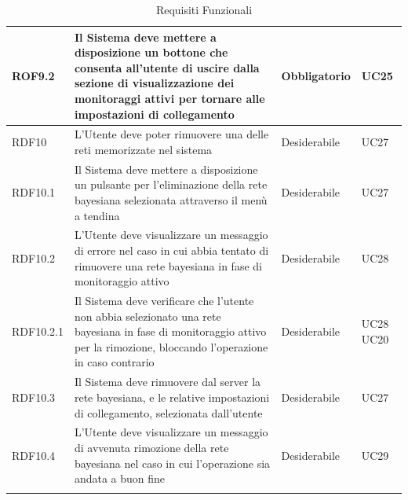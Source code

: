 \begin{center}
\begin{longtable}[c]{|m{}|m{}|m{}|m{}|}
\hline
\rowcolor{grigio}ROF9.2 & Il Sistema deve mettere a disposizione un bottone che consenta all'utente di uscire dalla sezione di visualizzazione dei monitoraggi attivi per tornare alle impostazioni di collegamento  & Obbligatorio & UC25\\
\hline
RDF10 & L'Utente deve poter rimuovere una delle reti memorizzate nel sistema & Desiderabile & UC27\\
\hline
\rowcolor{grigio}RDF10.1 & Il Sistema deve mettere a disposizione un pulsante per l'eliminazione della rete bayesiana selezionata attraverso il menù a tendina & Desiderabile & UC27\\
\hline
RDF10.2 & L'Utente deve visualizzare un messaggio di errore nel caso in cui abbia tentato di rimuovere una rete bayesiana in fase di monitoraggio attivo & Desiderabile & UC28\\
\hline
\rowcolor{grigio}RDF10.2.1 & Il Sistema deve verificare che l'utente non abbia selezionato una rete bayesiana in fase di monitoraggio attivo per la rimozione, bloccando l'operazione in caso contrario & Desiderabile & UC28 UC20\\
\hline
RDF10.3 & Il Sistema deve rimuovere dal server la rete bayesiana, e le relative impostazioni di collegamento, selezionata dall'utente & Desiderabile & UC27\\
\hline
\rowcolor{grigio}RDF10.4 & L'Utente deve visualizzare un messaggio di avvenuta rimozione della rete bayesiana nel caso in cui l'operazione sia andata a buon fine & Desiderabile & UC29\\
\hline
\caption{Requisiti Funzionali}
\end{longtable}
\end{center}


